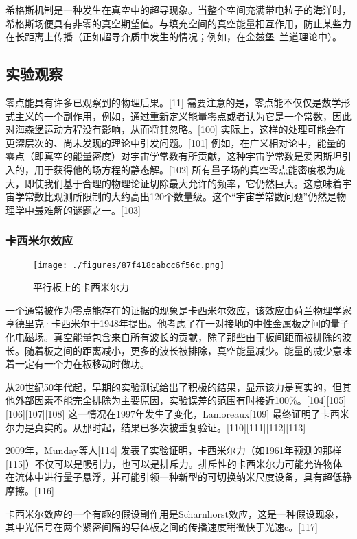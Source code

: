 希格斯机制是一种发生在真空中的超导现象。当整个空间充满带电粒子的海洋时，希格斯场便具有非零的真空期望值。与填充空间的真空能量相互作用，防止某些力在长距离上传播（正如超导介质中发生的情况；例如，在金兹堡–兰道理论中）。
\subsection{实验观察} 
零点能具有许多已观察到的物理后果。[11] 需要注意的是，零点能不仅仅是数学形式主义的一个副作用，例如，通过重新定义能量零点或者认为它是一个常数，因此对海森堡运动方程没有影响，从而将其忽略。[100] 实际上，这样的处理可能会在更深层次的、尚未发现的理论中引发问题。[101] 例如，在广义相对论中，能量的零点（即真空的能量密度）对宇宙学常数有所贡献，这种宇宙学常数是爱因斯坦引入的，用于获得他的场方程的静态解。[102] 所有量子场的真空零点能密度极为庞大，即使我们基于合理的物理论证切除最大允许的频率，它仍然巨大。这意味着宇宙学常数比观测所限制的大约高出120个数量级。这个“宇宙学常数问题”仍然是物理学中最难解的谜题之一。[103]
\subsubsection{卡西米尔效应}
\begin{figure}[ht]
\centering
\texttt{[image: ./figures/87f418cabcc6f56c.png]}
\caption{平行板上的卡西米尔力} \label{fig_LD_12}
\end{figure}
一个通常被作为零点能存在的证据的现象是卡西米尔效应，该效应由荷兰物理学家亨德里克·卡西米尔于1948年提出。他考虑了在一对接地的中性金属板之间的量子化电磁场。真空能量包含来自所有波长的贡献，除了那些由于板间距而被排除的波长。随着板之间的距离减小，更多的波长被排除，真空能量减少。能量的减少意味着一定有一个力在板移动时做功。

从20世纪50年代起，早期的实验测试给出了积极的结果，显示该力是真实的，但其他外部因素不能完全排除为主要原因，实验误差的范围有时接近100\%。[104][105][106][107][108] 这一情况在1997年发生了变化，Lamoreaux[109] 最终证明了卡西米尔力是真实的。从那时起，结果已多次被重复验证。[110][111][112][113]

2009年，Munday等人[114] 发表了实验证明，卡西米尔力（如1961年预测的那样[115]）不仅可以是吸引力，也可以是排斥力。排斥性的卡西米尔力可能允许物体在流体中进行量子悬浮，并可能引领一种新型的可切换纳米尺度设备，具有超低静摩擦。[116]

卡西米尔效应的一个有趣的假设副作用是Scharnhorst效应，这是一种假设现象，其中光信号在两个紧密间隔的导体板之间的传播速度稍微快于光速c。[117]
